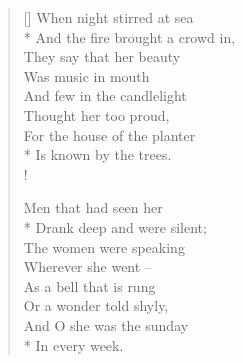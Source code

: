 \documentclass[MAIN]{subfiles}
\begin{document}
\settowidth{\versewidth}{And the fire brought a crowd in,}
\begin{verse}[\versewidth]
When night stirred at sea\\*
And the fire brought a crowd in,\\
They say that her beauty\\
Was music in mouth\\
And few in the candlelight\\
Thought her too proud,\\
For the house of the planter\\*
Is known by the trees.\\!

Men that had seen her\\*
Drank deep and were silent;\\
The women were speaking\\
Wherever she went --\\
As a bell that is rung\\
Or a wonder told shyly,\\
And O she was the sunday\\*
In every week.
\end{verse}
\end{document}
